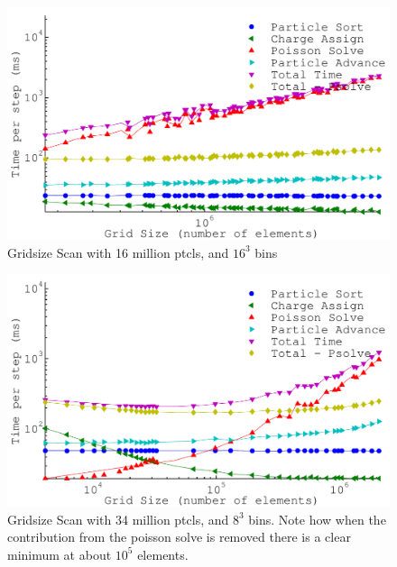 \begin{figure}[h]
\begin{center}
\includegraphics[width=6in]{performance/gridsize_scan16ptcls16bins.pdf}
\end{center}
\caption{Gridsize Scan with 16 million ptcls, and $16^3$ bins}
\label{fig:nptclsize_scan128x64x64}
\end{figure}

\begin{figure}[h]
\begin{center}
\includegraphics[width=6in]{performance/gridsize_scan34ptcls8bins.pdf}
\end{center}
\caption{Gridsize Scan with 34 million ptcls, and $8^3$ bins. Note how when the contribution from the poisson solve is removed there is a clear minimum at about $10^5$ elements. }
\label{fig:nptclsize_scan128x64x64}
\end{figure}

